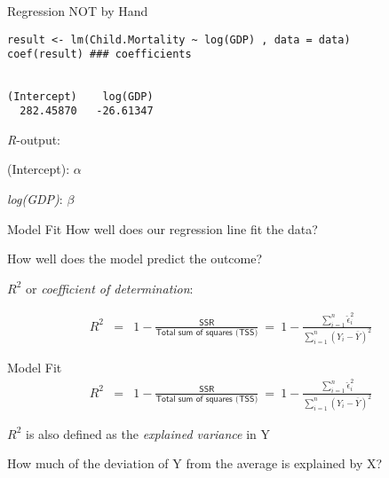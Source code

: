 \documentclass[presentation]{beamer}
\begin{document}
\begin{frame}[fragile,label={sec:orgf4af073}]{Regression NOT by Hand}
 \begin{verbatim}
result <- lm(Child.Mortality ~ log(GDP) , data = data)
coef(result) ### coefficients
\end{verbatim}

\begin{verbatim}

(Intercept)    log(GDP) 
  282.45870   -26.61347
\end{verbatim}

\emph{R}-output:

(Intercept): \(\alpha\)

\emph{log(GDP)}: \(\beta\)
\end{frame}

\begin{frame}[label={sec:org5c25beb}]{Model Fit}
How well does our regression line fit the data?

How well does the model predict the outcome?

\pause

\(R^{2}\) or \emph{coefficient of determination}:

\begin{eqnarray*}
      R^2 & = & 1 - \frac{\textsf{SSR}}{\textsf{Total sum of squares (TSS)}}  \ = \ 1 - \frac{\sum_{i=1}^n \hat\epsilon_i^2}{\sum_{i=1}^n (Y_i - \overline{Y})^2}
    \end{eqnarray*}
\end{frame}

\begin{frame}[label={sec:orgde74bc3}]{Model Fit}
\begin{eqnarray*}
      R^2 & = & 1 - \frac{\textsf{SSR}}{\textsf{Total sum of squares (TSS)}}  \ = \ 1 - \frac{\sum_{i=1}^n \hat\epsilon_i^2}{\sum_{i=1}^n (Y_i - \overline{Y})^2}
    \end{eqnarray*}

\(R^{2}\) is also defined as the \emph{explained variance} in Y

How much of the deviation of Y from the average is explained by X?
\end{frame}
\end{document}
